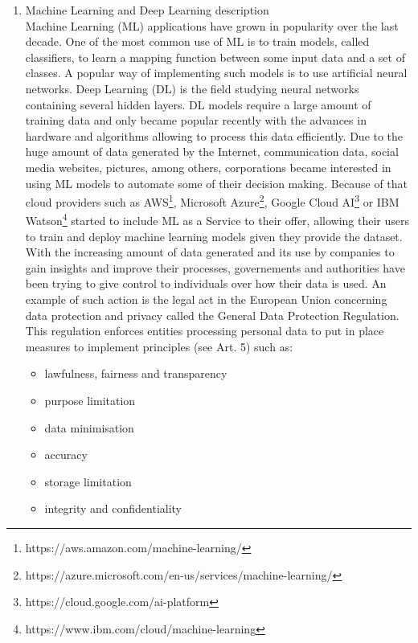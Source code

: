 \documentclass[11pt]{article}
\begin{document}
\begin{enumerate}
	\item Machine Learning and Deep Learning description\\
Machine Learning (ML) applications have grown in popularity over the last decade. One of the most common use of ML is to train models, called classifiers, to learn a mapping function between some input data and a set of classes. A popular way of implementing such models is to use artificial neural networks. Deep Learning (DL) is the field studying neural networks containing several hidden layers. DL models require a large amount of training data and only became popular recently with the advances in hardware and algorithms allowing to process this data efficiently. Due to the huge amount of data generated by the Internet, communication data, social media websites, pictures, among others, corporations became interested in using ML models to automate some of their decision making. Because of that cloud providers such as AWS\footnote{https://aws.amazon.com/machine-learning/}, Microsoft Azure\footnote{https://azure.microsoft.com/en-us/services/machine-learning/}, Google Cloud AI\footnote{https://cloud.google.com/ai-platform} or IBM Watson\footnote{https://www.ibm.com/cloud/machine-learning} started to include ML as a Service to their offer, allowing their users to train and deploy machine learning models given they provide the dataset.\\
With the increasing amount of data generated and its use by companies to gain insights and improve their processes, governements and authorities have been trying to give control to individuals over how their data is used. An example of such action is the legal act in the European Union concerning data protection and privacy called the General Data Protection Regulation. This regulation enforces entities processing personal data to put in place measures to implement principles (see Art. 5) such as:
\begin{itemize}
	\item lawfulness, fairness and transparency
	\item purpose limitation
	\item data minimisation
	\item accuracy
	\item storage limitation
	\item integrity and confidentiality
\end{itemize}

\end{enumerate}
\end{document}
